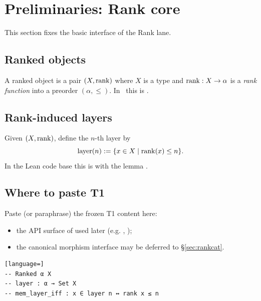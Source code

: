 \section{Preliminaries: Rank core}
\label{sec:rankcore}

This section fixes the basic interface of the Rank lane.

\subsection{Ranked objects}
\begin{definition}
A ranked object is a pair $(X,\mathrm{rank})$ where $X$ is a type and
$\mathrm{rank} : X \to \alpha$ is a \emph{rank function} into a preorder $(\alpha,\le)$.
In \Lean\ this is .
\end{definition}

\subsection{Rank-induced layers}
Given $(X,\mathrm{rank})$, define the $n$-th layer by
\[
  \mathrm{layer}(n) := \{x \in X \mid \mathrm{rank}(x)\le n\}.
\]
In the Lean code base this is  with the lemma
.

\subsection{Where to paste T1}
Paste (or paraphrase) the frozen T1 content here:
\begin{itemize}
\item the API surface of  used later (e.g. , );
\item the canonical morphism interface  may be deferred to \S\ref{sec:rankcat}.
\end{itemize}

\begin{lstlisting}[language=]
-- Ranked α X
-- layer : α → Set X
-- mem_layer_iff : x ∈ layer n ↔ rank x ≤ n
\end{lstlisting}
